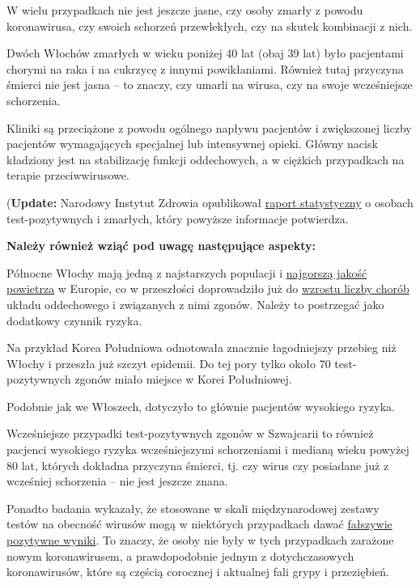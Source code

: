 W wielu przypadkach nie jest jeszcze jasne, czy osoby zmarły z powodu
koronawirusa, czy swoich schorzeń przewlekłych, czy na skutek kombinacji
z nich.

Dwóch Włochów zmarłych w wieku poniżej 40 lat (obaj 39 lat) było
pacjentami chorymi na raka i na cukrzycę z innymi powikłaniami. Również
tutaj przyczyna śmierci nie jest jasna -- to znaczy, czy umarli na
wirusa, czy na swoje wcześniejsze schorzenia.

Kliniki są przeciążone z powodu ogólnego napływu pacjentów i zwiększonej
liczby pacjentów wymagających specjalnej lub intensywnej opieki. Główny
nacisk kładziony jest na stabilizację funkcji oddechowych, a w ciężkich
przypadkach na terapie przeciwwirusowe.

(\textbf{Update:} Narodowy Instytut Zdrowia opublikował
\href{https://www.epicentro.iss.it/coronavirus/bollettino/Report-COVID-2019_17_marzo-v2.pdf}{raport
statystyczny} o osobach test-pozytywnych i zmarłych, który powyższe
informacje potwierdza.

\textbf{Należy również wziąć pod uwagę następujące aspekty:}

Północne Włochy mają jedną z najstarszych populacji i
\href{https://twitter.com/esa/status/1238480433047916545}{najgorszą
jakość powietrza} w Europie, co w przeszłości doprowadziło już do
\href{https://www.thelocal.it/20170131/our-lungs-are-breaking-smog-levels-way-above-safe-limits-in-northern-italy}{wzrostu
liczby chorób} układu oddechowego i związanych z nimi zgonów. Należy to
postrzegać jako dodatkowy czynnik ryzyka.

Na przykład Korea Południowa odnotowała znacznie łagodniejszy przebieg
niż Włochy i przeszła już szczyt epidemii. Do tej pory tylko około 70
test-pozytywnych zgonów miało miejsce w Korei Południowej.

Podobnie jak we Włoszech, dotyczyło to głównie pacjentów wysokiego
ryzyka.

Wcześniejsze przypadki test-pozytywnych zgonów w Szwajcarii to również~
pacjenci wysokiego ryzyka wcześniejszymi schorzeniami i medianą wieku
powyżej 80 lat, których dokładna przyczyna śmierci, tj. czy wirus czy
posiadane już z wcześniej schorzenia -- nie jest jeszcze znana.

Ponadto badania wykazały, że stosowane w skali międzynarodowej zestawy
testów na obecność wirusów mogą w niektórych przypadkach dawać
\href{https://www.ncbi.nlm.nih.gov/pmc/articles/PMC2095096/}{fałszywie
pozytywne wyniki}. To znaczy, że osoby nie były w tych przypadkach
zarażone nowym koronawirusem, a prawdopodobnie jednym z dotychczasowych
koronawirusów, które są częścią corocznej i aktualnej fali grypy i
przeziębień.

